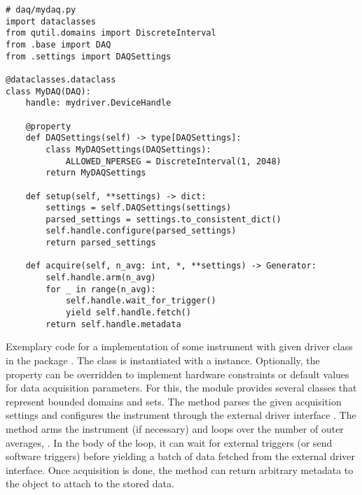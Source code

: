 \begin{listing}
    \begin{verbatim}
# daq/mydaq.py
import dataclasses
from qutil.domains import DiscreteInterval
from .base import DAQ
from .settings import DAQSettings

@dataclasses.dataclass
class MyDAQ(DAQ):
    handle: mydriver.DeviceHandle

    @property
    def DAQSettings(self) -> type[DAQSettings]:
        class MyDAQSettings(DAQSettings):
            ALLOWED_NPERSEG = DiscreteInterval(1, 2048)
        return MyDAQSettings

    def setup(self, **settings) -> dict:
        settings = self.DAQSettings(settings)
        parsed_settings = settings.to_consistent_dict()
        self.handle.configure(parsed_settings)
        return parsed_settings

    def acquire(self, n_avg: int, *, **settings) -> Generator:
        self.handle.arm(n_avg)
        for _ in range(n_avg):
            self.handle.wait_for_trigger()
            yield self.handle.fetch()
        return self.handle.metadata
    \end{verbatim}
    \caption[ pseudocode]{
        Exemplary code for a  implementation of some instrument with given driver class  in the package .
        The  class is instantiated with a  instance.
        Optionally, the  property can be overridden to implement hardware constraints or default values for data acquisition parameters.
        For this, the  module provides several classes that represent bounded domains and sets.
        The  method parses the given acquisition settings and configures the instrument through the external driver interface .
        The  method arms the instrument (if necessary) and loops over the number of outer averages, .
        In the body of the loop, it can wait for external triggers (or send software triggers) before yielding a batch of data fetched from the external driver interface.
        Once acquisition is done, the method can return arbitrary metadata to the  object to attach to the stored data.
    }
    \label{lst:speck:daq:pseudocode}
\end{listing}

